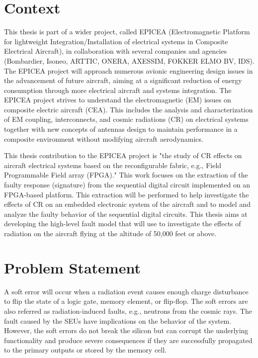 

\section{Context}
\label{introduction}

This thesis is part of a wider project, called EPICEA (Electromagnetic Platform for lightweight 
Integration/Installation of electrical systems in Composite Electrical Aircraft), in collaboration with several 
companies and agencies (Bombardier, Isoneo, ARTTIC, ONERA, AXESSIM, FOKKER ELMO BV, IDS). The EPICEA project will approach
numerous avionic engineering design issues in the advancement of future aircraft, aiming at a significant
reduction of energy consumption through more electrical aircraft and systems integration. The EPICEA project strives to understand the electromagnetic (EM) issues on composite electric aircraft (CEA). This includes the analysis
and characterization of EM coupling, interconnects, and cosmic radiations (CR) on electrical systems together
with new concepts of antennas design to maintain performance in a composite environment without modifying
aircraft aerodynamics.

This thesis contribution to the EPICEA project is "the study of CR effects on aircraft electrical systems based on the reconfigurable fabric, e.g., Field Programmable Field array (FPGA)." This work focuses on the extraction of the faulty response (signature) from the sequential digital circuit implemented on an FPGA-based platform. This extraction will be performed to help investigate the effects of CR on an embedded electronic system of the aircraft and to model and analyze the faulty behavior of the sequential digital circuits. This thesis aims at developing the high-level fault model that will use to investigate the effects of radiation on the aircraft flying at the altitude of 50,000 feet or above. 

\section{Problem Statement}

A soft error will occur when a radiation event causes enough charge disturbance to flip the state of a logic gate, memory element, or flip-flop. The soft errors are also referred as radiation-induced faults, e.g., neutrons from the cosmic rays. The fault caused by the SEUs have implications on the behavior of the system. However, the soft errors do not break the silicon but can corrupt the underlying functionality and produce severe consequences if they are successfully propagated to the primary outputs or stored by the memory cell.



